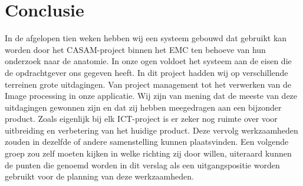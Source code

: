\section{Conclusie}
\label{Conclusie}
In de afgelopen tien weken hebben wij een systeem gebouwd dat gebruikt kan worden door het CASAM-project binnen het EMC ten behoeve van hun onderzoek naar de anatomie. In onze ogen voldoet het systeem aan de eisen die de opdrachtgever ons gegeven heeft. 
In dit project hadden wij op verschillende terreinen grote uitdagingen. Van project management tot het verwerken van de Image processing in onze applicatie. Wij zijn van mening dat de meeste van deze uitdagingen gewonnen zijn en dat zij hebben meegedragen aan een bijzonder product. 
Zoals eigenlijk bij elk ICT-project is er zeker nog ruimte over voor uitbreiding en verbetering van het huidige product. Deze vervolg werkzaamheden zouden in dezelfde of andere samenstelling kunnen plaatsvinden. Een volgende groep zou zelf moeten kijken in welke richting zij door willen, uiteraard kunnen de punten die genoemd worden in dit verslag als een uitgangspositie worden gebruikt voor de planning van deze werkzaamheden.

